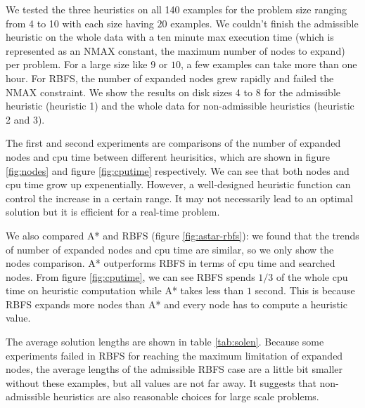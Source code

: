 We tested the three heuristics on all 140 examples for the problem size ranging from 4 to 10 with each size having $20$ examples. We couldn't finish the admissible heuristic on the whole data with a ten minute max execution time (which is represented as an NMAX constant, the maximum number of nodes to expand)  per problem. For a large size like $9$ or $10$, a few examples can take more than one hour. For RBFS, the number of expanded nodes grew rapidly and failed the NMAX constraint. We show the results on disk sizes 4 to 8 for the admissible heuristic (heuristic 1) and the whole data for non-admissible heuristics (heuristic 2 and 3). 

The first and second experiments are comparisons of the number of expanded nodes and cpu time between different heurisitics, which are shown in figure \ref{fig:nodes} and figure \ref{fig:cputime} respectively. We can see that both nodes and cpu time grow up expenentially. However, a well-designed heuristic function can control the increase in a certain range. It may not necessarily lead to an optimal solution but it is efficient for a real-time problem. 

We also compared A* and RBFS (figure \ref{fig:astar-rbfs}): we found that the trends of number of expanded nodes and cpu time are similar, so we only show the nodes comparison. A* outperforms RBFS in terms of cpu time and searched nodes. From figure \ref{fig:cputime}, we can see RBFS spends $1/3$ of the whole cpu time on heuristic computation while A* takes less than $1$ second. This is because RBFS expands more nodes than A* and every node has to compute a heuristic value.

The average solution lengths are shown in table \ref{tab:solen}. Because some experiments failed in RBFS for reaching the maximum limitation of expanded nodes, the average lengths of the admissible RBFS case are a little bit smaller without these examples, but all values are not far away. It suggests that non-admissible heuristics are also reasonable choices for large scale problems.

